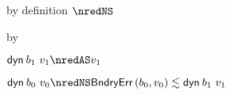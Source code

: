 {\begin{lamportproof*}
    \begin{pfproof}
        \begin{pfproof}
            \begin{pfproof}
              by definition $\nredNS$
            \end{pfproof}
            \begin{pfproof}
              by 
            \end{pfproof}
          \qedstep
            \begin{pfproof}
              $\edyn{\sbnd_1}{\svalue_1} \nredAS \svalue_1$
            \end{pfproof}
        \end{pfproof}
        \begin{pfproof}
          \qedstep
            \begin{pfproof}
              $\edynb{\sbnd_0}{\svalue_0} \nredNS \rexpr{\boundaryerror{\sbnd_0}{\svalue_0}}{\edynb{\sbnd_1}{\svalue_1}}$
            \end{pfproof}
        \end{pfproof}
    \end{pfproof}


\end{lamportproof*}}
